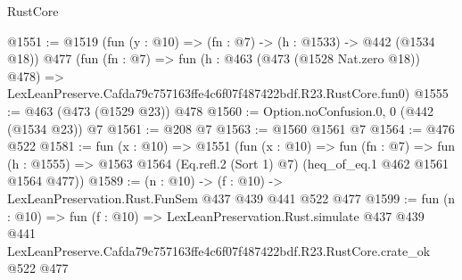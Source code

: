 \begin{lexlean}{RustCore}
\begin{coremodule}
@1551 := @1519
    (fun (y : @10) => (fn : @7) -> (h : @1533) -> @442 (@1534 @18))
    @477
    (fun (fn : @7) =>
    fun (h : @463 (@473 (@1528 Nat.zero @18)) @478) =>
    LexLeanPreserve.Cafda79c757163ffe4c6f07f487422bdf.R23.RustCore.fun0)
@1555 := @463 (@473 (@1529 @23)) @478
@1560 := Option.noConfusion.{0, 0} (@442 (@1534 @23)) @7
@1561 := @208 @7
@1563 := @1560 @1561 @7
@1564 := @476 @522
@1581 := fun (x : @10) =>
  @1551
    (fun (x : @10) =>
    fun (fn : @7) =>
    fun (h : @1555) => @1563 @1564 (Eq.refl.{2} (Sort 1) @7) (heq_of_eq.{1} @462 @1561 @1564 @477))
@1589 := (n : @10) -> (f : @10) -> LexLeanPreservation.Rust.FunSem @437 @439 @441 @522 @477
@1599 := fun (n : @10) =>
  fun (f : @10) =>
  LexLeanPreservation.Rust.simulate
    @437
    @439
    @441
    LexLeanPreserve.Cafda79c757163ffe4c6f07f487422bdf.R23.RustCore.crate_ok
    @522
    @477
\end{coremodule}
\end{lexlean}
